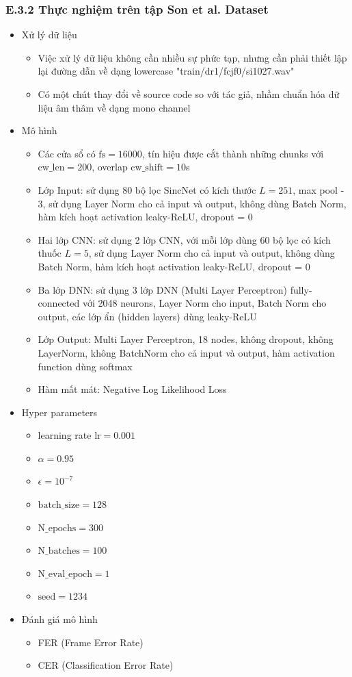 \documentclass{article}
\begin{document}
	\subsubsection{E.3.2 Thực nghiệm trên tập Son et al. Dataset}
	\begin{itemize}
		\item Xử lý dữ liệu
		\begin{itemize}
			\item Việc xử lý dữ liệu không cần nhiều sự phức tạp, nhưng cần phải thiết lập lại đường dẫn về dạng lowercase "train/dr1/fcjf0/si1027.wav"
			\item Có một chút thay đổi về source code so với tác giả, nhầm chuẩn hóa dữ liệu âm thâm về dạng mono channel
		\end{itemize}
		\item Mô hình 
			\begin{itemize}
			\item Các cửa sổ có $\text{fs} = 16000$, tín hiệu được cắt thành những chunks với $\text{cw\_len}=200$, overlap $\text{cw\_shift}=10$s
			\item Lớp Input: sử dụng 80 bộ lọc SincNet có kích thước $L=251$, max pool - 3, sử dụng Layer Norm cho cả input và output, không dùng Batch Norm, hàm kích hoạt activation leaky-ReLU, dropout = 0
			\item Hai lớp CNN: sử dụng 2 lớp CNN, với mỗi lớp dùng 60 bộ lọc có kích thuốc $L=5$, sử dụng Layer Norm cho cả input và output, không dùng Batch Norm, hàm kích hoạt activation leaky-ReLU, dropout = 0
			\item Ba lớp DNN: sử dụng 3 lớp DNN (Multi Layer Perceptron) fully-connected với 2048 neurons, Layer Norm cho input, Batch Norm cho output, các lớp ẩn (hidden layers) dùng leaky-ReLU
			\item Lớp Output: Multi Layer Perceptron, 18 nodes, không dropout, không LayerNorm, không BatchNorm cho cả input và output, hàm activation function dùng softmax
			\item Hàm mất mát: Negative Log Likelihood Loss
		\end{itemize}
		\item Hyper parameters
		\begin{itemize}
			\item learning rate $\text{lr} = 0.001$
			\item $\alpha = 0.95$
			\item $\epsilon = 10^{-7}$
			\item $\text{batch\_size}=128$
			\item $\text{N\_epochs}=300$
			\item $\text{N\_batches}=100$
			\item $\text{N\_eval\_epoch}=1$
			\item $\text{seed}=1234$
		\end{itemize}
		\item Đánh giá mô hình
		\begin{itemize}
			\item FER (Frame Error Rate)
			\item CER (Classification Error Rate)
			
		\end{itemize}
	\end{itemize}
\end{document}
